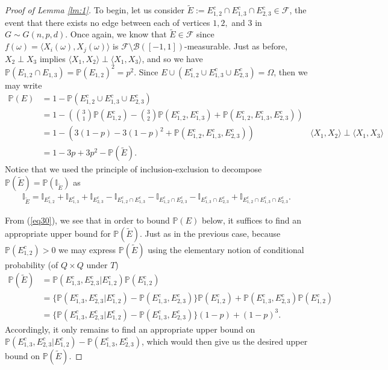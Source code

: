 \documentclass{article}
\begin{document}
\begin{proof}[Proof of Lemma \ref{lm:1}]
To begin, let us consider $\widetilde{E} := E_{1,2}^c \cap E_{1,3}^c \cap E_{2,3}^c \in \mathcal{F}$, the event that there exists no edge between each of vertices $1, 2,$ and $3$ in $G \sim G(n, p, d)$. Once again, we know that $\widetilde{E} \in \mathcal{F}$ since $f(\omega) = \langle X_i(\omega), X_j(\omega) \rangle$ is $\mathcal{F} \setminus \mathcal{B}([-1, 1])$-measurable. Just as before, $X_2 \perp X_3$ implies $\langle X_1, X_2 \rangle \perp \langle X_1, X_3 \rangle$, and so we have $\mathbb{P}(E_{1,2} \cap E_{1,3}) = \mathbb{P}(E_{1,2})^2 = p^2$. Since $E \cup (E_{1,2}^c \cup E_{1,3}^c \cup E_{2,3}^c) = \Omega$, then we may write
\begin{align}
    \mathbb{P}(E) &= 1 - \mathbb{P}(E_{1,2}^c \cup E_{1,3}^c \cup E_{2,3}^c) \nonumber\\
    &= 1 - \left(\binom{3}{1} \mathbb{P}(E_{1,2}^c) - \binom{3}{2}\mathbb{P}(E_{1,2}^c, E_{1,3}^c)  + \mathbb{P}(E_{1,2}^c, E_{1,3}^c, E_{2,3}^c) \right)\nonumber\\
    &= 1 - \left(3(1-p) - 3(1-p)^2 + \mathbb{P}(E_{1,2}^c, E_{1,3}^c, E_{2,3}^c) \right) & \langle X_1, X_2 \rangle \perp \langle X_1, X_3 \rangle \nonumber\\
    &= 1 - 3p + 3p^2 -\mathbb{P}(\widetilde{E})\label{eq30}.
\end{align}
Notice that we used the principle of inclusion-exclusion to decompose $\mathbb{P}(\widetilde{E}) = \mathbb{P}(\mathbb{I}_{\widetilde{E}})$ as
\begin{align*}
    \mathbb{I}_{\widetilde{E}} = \mathbb{I}_{E_{1,2}^c} + \mathbb{I}_{E_{1,3}^c} + \mathbb{I}_{E_{2,3}^c} - \mathbb{I}_{E_{1,2}^c \cap E_{1,3}^c} - \mathbb{I}_{E_{1,2}^c \cap E_{2,3}^c} - \mathbb{I}_{E_{1,3}^c \cap E_{2,3}^c} + \mathbb{I}_{E_{1,2}^c \cap E_{1,3}^c \cap E_{2,3}^c}.
\end{align*}

From (\ref{eq30}), we see that in order to bound $\mathbb{P}(E)$ below, it suffices to find an appropriate upper bound for $\mathbb{P}(\widetilde{E})$. Just as in the previous case, because $\mathbb{P}(E_{1,2}^c)> 0$ we may express $\mathbb{P}(\widetilde{E})$ using the elementary notion of conditional probability (of $Q \times Q$ under $T$)
\begin{align}
    \mathbb{P}(\widetilde{E}) &= \mathbb{P}(E_{1,3}^c, E_{2,3}^c|E_{1,2}^c)\mathbb{P}(E_{1,2}^c) \nonumber\\
    &= \{ \mathbb{P}(E_{1,3}^c, E_{2,3}^c|E_{1,2}^c) - \mathbb{P}(E_{1,3}^c, E_{2,3}^c) \}\mathbb{P}(E_{1,2}^c) + \mathbb{P}(E_{1,3}^c, E_{2,3}^c)\mathbb{P}(E_{1,2}^c) \nonumber\\
    &= \{ \mathbb{P}(E_{1,3}^c, E_{2,3}^c|E_{1,2}^c) - \mathbb{P}(E_{1,3}^c, E_{2,3}^c) \}(1-p) + (1-p)^3\label{eq31}.
\end{align}
Accordingly, it only remains to find an appropriate upper bound on $\mathbb{P}(E_{1,3}^c, E_{2,3}^c|E_{1,2}^c) - \mathbb{P}(E_{1,3}^c, E_{2,3}^c)$, which would then give us the desired upper bound on $\mathbb{P}(\widetilde{E})$. 


\end{proof}
\end{document}
